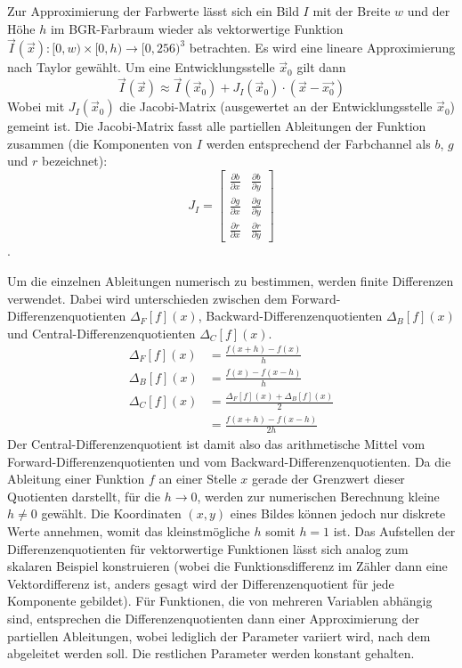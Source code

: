 \documentclass{whswinvcbook}
\begin{document}
Zur Approximierung der Farbwerte lässt sich ein Bild $I$ mit der Breite $w$ und der Höhe $h$ im BGR-Farbraum wieder als vektorwertige Funktion $\vec{I}(\vec{x}):[0,w)\times[0,h)\rightarrow[0,256)^3$ betrachten. Es wird eine lineare Approximierung nach Taylor gewählt. Um eine Entwicklungsstelle $\vec{x}_0$ gilt dann $$\vec{I}(\vec{x})\approx\vec{I}(\vec{x}_0)+J_I(\vec{x}_0)\cdot(\vec{x}-\vec{x_0})$$
Wobei mit $J_I(\vec{x}_0)$ die Jacobi-Matrix (ausgewertet an der Entwicklungsstelle $\vec{x}_0$) gemeint ist. Die Jacobi-Matrix fasst alle partiellen Ableitungen der Funktion zusammen (die Komponenten von $I$ werden entsprechend der Farbchannel als $b$, $g$ und $r$ bezeichnet): $$J_I=\begin{bmatrix}\frac{\partial b}{\partial x}&\frac{\partial b}{\partial y}\\\frac{\partial g}{\partial x}&\frac{\partial g}{\partial y}\\\frac{\partial r}{\partial x}&\frac{\partial r}{\partial y}\end{bmatrix}$$.

Um die einzelnen Ableitungen numerisch zu bestimmen, werden finite Differenzen verwendet. Dabei wird unterschieden zwischen dem Forward-Differenzenquotienten $\Delta_F[f](x)$, Backward-Differenzenquotienten $\Delta_B[f](x)$ und Central-Differenzenquotienten $\Delta_C[f](x)$.
\begin{align*}
    \Delta_F[f](x) &= \frac{f(x+h)-f(x)}{h}\\
    \Delta_B[f](x) &= \frac{f(x)-f(x-h)}{h}\\
    \Delta_C[f](x) &= \frac{\Delta_F[f](x)+\Delta_B[f](x)}{2}\\
                   &= \frac{f(x+h)-f(x-h)}{2h}
\end{align*}
Der Central-Differenzenquotient ist damit also das arithmetische Mittel vom Forward-Differenzenquotienten und vom Backward-Differenzenquotienten. Da die Ableitung einer Funktion $f$ an einer Stelle $x$ gerade der Grenzwert dieser Quotienten darstellt, für die $h\rightarrow0$, werden zur numerischen Berechnung kleine $h\neq0$ gewählt. Die Koordinaten $(x,y)$ eines Bildes können jedoch nur diskrete Werte annehmen, womit das kleinstmögliche $h$ somit $h=1$ ist. Das Aufstellen der Differenzenquotienten für vektorwertige Funktionen lässt sich analog zum skalaren Beispiel konstruieren (wobei die Funktionsdifferenz im Zähler dann eine Vektordifferenz ist, anders gesagt wird der Differenzenquotient für jede Komponente gebildet). Für Funktionen, die von mehreren Variablen abhängig sind, entsprechen die Differenzenquotienten dann einer Approximierung der partiellen Ableitungen, wobei lediglich der Parameter variiert wird, nach dem abgeleitet werden soll. Die restlichen Parameter werden konstant gehalten.
\end{document}
